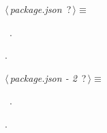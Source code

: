 	\begin{flushleft} \small
\begin{minipage}{\linewidth}\label{scrap1}\raggedright\small
{} $\langle\,${\itshape {package.json}}\nobreak\ {\footnotesize {?}}$\,\rangle\equiv$
\vspace{-1ex}
\begin{list}{}{} \item

                
        {\NWsep}
\end{list}
\vspace{-1.5ex}
\footnotesize
\begin{list}{}{\setlength{\itemsep}{-\parsep}\setlength{\itemindent}{-\leftmargin}}
\item \NWtxtMacroDefBy\ .
\item {\NWtxtMacroNoRef}.

\item{}
\end{list}
\end{minipage}\vspace{4ex}
\end{flushleft}
\begin{flushleft} \small
\begin{minipage}{\linewidth}\label{scrap2}\raggedright\small
{} $\langle\,${\itshape {package.json - 2}}\nobreak\ {\footnotesize {?}}$\,\rangle\equiv$
\vspace{-1ex}
\begin{list}{}{} \item

                
        {\NWsep}
\end{list}
\vspace{-1.5ex}
\footnotesize
\begin{list}{}{\setlength{\itemsep}{-\parsep}\setlength{\itemindent}{-\leftmargin}}
\item \NWtxtMacroDefBy\ .
\item {\NWtxtMacroNoRef}.

\item{}
\end{list}
\end{minipage}\vspace{4ex}
\end{flushleft}
